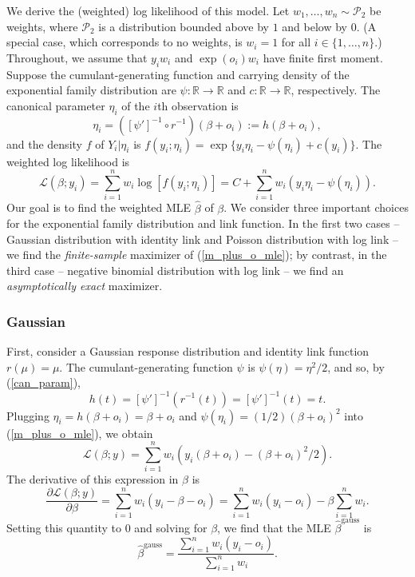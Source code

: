 \documentclass[12pt]{article}
\begin{document}
\begin{appendices}
\begin{refsection}
		We derive the (weighted) log likelihood of this model. Let $w_1, \dots, w_n \sim \mathcal{P}_2$ be weights, where $\mathcal{P}_2$ is a distribution bounded above by $1$ and below by $0$. (A special case, which corresponds to no weights, is $w_i = 1$ for all $i \in \{1, \dots, n\}$.) Throughout, we assume that $y_iw_i$ and $\exp(o_i)w_i$ have finite first moment.  Suppose the cumulant-generating function and carrying density of the exponential family distribution are $\psi:\mathbb{R} \to \mathbb{R}$ and $c: \mathbb{R} \to \mathbb{R}$, respectively. The canonical parameter $\eta_i$ of the $i$th observation is 
		\begin{equation}\label{can_param}
		\eta_i = ([\psi']^{-1} \circ r^{-1})(\beta + o_i) := h(\beta + o_i),
		\end{equation}
		and the density $f$ of $Y_i | \eta_i$ is
		$f(y_i; \eta_i) = \exp\{y_i \eta_i - \psi(\eta_i) + c(y_i)\}.$ The weighted log likelihood is
		\begin{equation}\label{m_plus_o_mle}
		\mathcal{L}(\beta;y_i) = \sum_{i=1}^n w_i\log\left[f(y_i;\eta_i)\right] = C + \sum_{i=1}^n w_i(y_i \eta _i - \psi(\eta_i)).
		\end{equation}
		Our goal is to find the weighted MLE $\hat{\beta}$ of $\beta$. We consider three important choices for the exponential family distribution and link function. %
		In the first two cases -- Gaussian distribution with identity link and Poisson distribution with log link -- we find the \textit{finite-sample} maximizer of (\ref{m_plus_o_mle}); by contrast, in the third case -- negative binomial distribution with log link -- we find an \textit{asymptotically exact} maximizer.
		
		\subsubsection*{Gaussian}
		First, consider a Gaussian response distribution and identity link function $r(\mu) = \mu$. The cumulant-generating function $\psi$ is $\psi(\eta) = \eta^2/2$, and so, by (\ref{can_param}),
		$$h(t) = [\psi']^{-1}( r^{-1}(t)) = [\psi']^{-1}(t) = t.$$
		Plugging $\eta_i = h(\beta + o_i) = \beta + o_i$ and $\psi(\eta_i) = (1/2)(\beta + o_i)^2$ into (\ref{m_plus_o_mle}), we obtain
		$$\mathcal{L}(\beta; y) = \sum_{i=1}^n w_i (y_i(\beta + o_i) - (\beta + o_i)^2/2).$$ The derivative of this expression in $\beta$ is
		$$\frac{\partial \mathcal{L}(\beta;y)}{\partial\beta} = \sum_{i=1}^n w_i (y_i - \beta - o_i) = \sum_{i=1}^n w_i(y_i - o_i) - \beta \sum_{i=1}^n w_i.$$ Setting this quantity to 0 and solving for $\beta$, we find that the MLE $\hat{\beta}^\textrm{gauss}$ is
		$$\hat{\beta}^\textrm{gauss} = \frac{\sum_{i=1}^n w_i (y_i - o_i)}{\sum_{i=1}^n w_i}.$$
		

\end{refsection}
\end{appendices}
\end{document}
